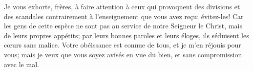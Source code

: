Je vous exhorte, frères,
		à faire attention à ceux qui provoquent des divisions et des scandales
	contrairement à l’enseignement que vous avez reçu:
	évitez-les!
Car les gens de cette espèce ne sont pas au service de notre Seigneur le Christ,
	mais de leurs propres appétits;
	par leurs bonnes paroles et leurs éloges,
		ils séduisent les cœurs sans malice.
Votre obéissance est connue de tous, et je m’en réjouis pour vous;
	mais je veux que vous soyez avisés en vue du bien,
	et sans compromission avec le mal.
